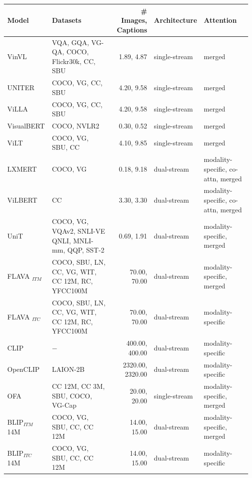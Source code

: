 \begin{table}[ht]
    \centering
    \small
    \begin{adjustbox}{max width=\textwidth}
    \begin{tabular}{l|lr|l|l}
    \toprule
    Model & Datasets & \# Images, Captions & Architecture & Attention \\\midrule
    VinVL \cite{zhang2021vinvl}  & VQA, GQA, VG-QA, COCO, Flickr30k, CC, SBU & 1.89, 4.87 & single-stream & merged \\
    UNITER \cite{chen2020uniter}  & COCO, VG, CC, SBU & 4.20, 9.58 & single-stream  &  merged \\
    ViLLA \cite{gan2020villa} & COCO, VG, CC, SBU  & 4.20, 9.58 & single-stream  &  merged \\
    VisualBERT \cite{li2019visualbert}& COCO, NVLR2 & 0.30, 0.52  & single-stream  & merged \\
    ViLT \cite{kim2021vilt}  & COCO, VG, SBU, CC & 4.10, 9.85 & single-stream  & merged \\
    LXMERT \cite{tan2020lxmert}  & COCO, VG & 0.18, 9.18 & dual-stream & modality-specific, co-attn, merged \\
    ViLBERT \cite{lu2019vilbert}  & CC & 3.30, 3.30 & dual-stream  & modality-specific, co-attn, merged \\
    UniT \cite{hu2021unit} & COCO, VG, VQAv2, SNLI-VE QNLI, MNLI-mm, QQP, SST-2 & 0.69, 1.91 & dual-stream & modality-specific, merged\\
    FLAVA $_{ITM}$ \cite{singh2022flava}  & COCO, SBU, LN, CC, VG, WIT, CC 12M, RC, YFCC100M & 70.00, 70.00 & dual-stream & modality-specific, merged \\
    FLAVA $_{ITC}$ \cite{singh2022flava}  & COCO, SBU, LN, CC, VG, WIT, CC 12M, RC, YFCC100M & 70.00, 70.00 & dual-stream & modality-specific \\
    CLIP \cite{radford2021clip}  & $-$ & 400.00, 400.00 & dual-stream & modality-specific \\
    OpenCLIP \cite{ilharco_gabriel_2021_5143773}  & LAION-2B & 2320.00, 2320.00 & dual-stream & modality-specific \\
    OFA \cite{wang2022unifying} &  CC 12M, CC 3M, SBU, COCO, VG-Cap  &  20.00, 20.00 &   single-stream & modality-specific, merged \\
    BLIP$_{ITM}$ 14M \cite{li2022blip} &  COCO, VG, SBU, CC, CC 12M  &  14.00, 15.00 &   dual-stream & modality-specific, merged \\
    BLIP$_{ITC}$ 14M \cite{li2022blip} &  COCO, VG, SBU, CC, CC 12M & 14.00, 15.00 &   dual-stream &         modality-specific \\

\end{tabular}
\end{adjustbox}
\end{table}
